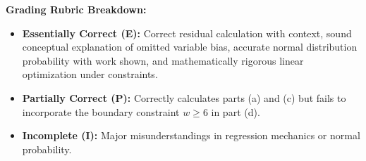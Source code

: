 \begin{frqrubricbox}
\textbf{Grading Rubric Breakdown:}\\
\begin{itemize}
  \item \textbf{Essentially Correct (E):} Correct residual calculation with context, sound conceptual explanation of omitted variable bias, accurate normal distribution probability with work shown, and mathematically rigorous linear optimization under constraints.
  \item \textbf{Partially Correct (P):} Correctly calculates parts (a) and (c) but fails to incorporate the boundary constraint $w \ge 6$ in part (d).
  \item \textbf{Incomplete (I):} Major misunderstandings in regression mechanics or normal probability.
\end{itemize}
\end{frqrubricbox}
